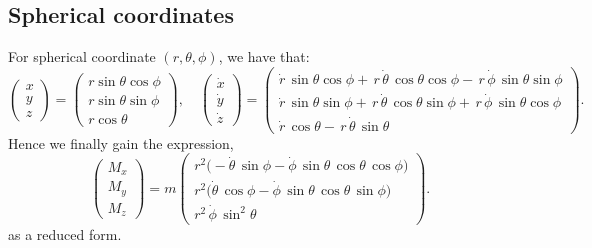 \subsection{Spherical coordinates}
For spherical coordinate $(r,\theta,\phi)$, we have that: 
\begin{equation}
    \begin{pmatrix}
        x \\
        y \\
        z
    \end{pmatrix}
    = 
    \begin{pmatrix}
        r \sin\theta \cos\phi \\
        r \sin\theta \sin\phi \\
        r \cos\theta
    \end{pmatrix}
    , 
    \quad 
    \begin{pmatrix}
        \dot{x} \\
        \dot{y} \\
        \dot{z}
    \end{pmatrix}
    = 
    \begin{pmatrix}
        \dot{r}\,\sin\theta \cos\phi 
        +\,r\,\dot{\theta}\,\cos\theta \cos\phi 
        -\,r\,\dot{\phi}\,\sin\theta \sin\phi
        \\
        \dot{r}\,\sin\theta \sin\phi 
        +\,r\,\dot{\theta}\,\cos\theta \sin\phi 
        +\,r\,\dot{\phi}\,\sin\theta \cos\phi
        \\
        \dot{r}\,\cos\theta 
        -\,r\,\dot{\theta}\,\sin\theta
    \end{pmatrix}.
\end{equation}
Hence we finally gain the expression, 
\begin{equation}
    \begin{pmatrix}
        M_{x} \\
        M_{y} \\
        M_{z}
    \end{pmatrix}
    =
    m
    \begin{pmatrix}
        r^{2}\bigl(-\dot{\theta}\,\sin\phi - \dot{\phi}\,\sin\theta\,\cos\theta\,\cos\phi\bigr) \\
        r^{2}\bigl(\dot{\theta}\,\cos\phi - \dot{\phi}\,\sin\theta\,\cos\theta\,\sin\phi\bigr) \\
        r^{2}\,\dot{\phi}\,\sin^{2}\theta
    \end{pmatrix}.
\end{equation}
as a reduced form. 
